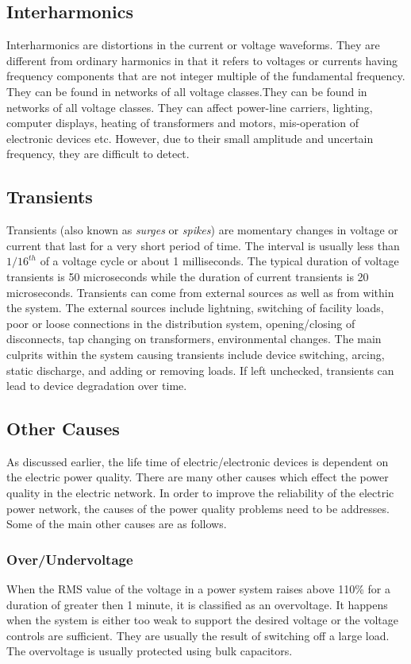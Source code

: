 \subsection{Interharmonics}
Interharmonics are distortions in the current or voltage waveforms. They are different from ordinary harmonics in that it refers to voltages or currents having frequency components that are not integer multiple of the fundamental frequency. They can be found in networks of all voltage classes.They can be found in networks of all voltage classes. They can affect power-line carriers, lighting, computer displays, heating of transformers and motors, mis-operation of electronic devices etc. However, due to their small amplitude and uncertain frequency, they are difficult to detect.

\subsection{Transients}
Transients (also known as \textit{surges} or \textit{spikes}) are momentary changes in voltage or current that last for a very short period of time. The interval is usually less than $1/16^{th}$ of a voltage cycle or about 1 milliseconds. The typical duration of voltage transients is 50 microseconds while the duration of current transients is 20 microseconds. Transients can come from external sources as well as from within the system. The external sources include lightning, switching of facility loads, poor or loose connections in the distribution system, opening/closing of disconnects, tap changing on transformers, environmental changes. The main culprits within the system causing transients include device switching, arcing, static discharge, and adding or removing loads. If left unchecked, transients can lead to device degradation over time.

\subsection{Other Causes}
As discussed earlier, the life time of electric/electronic devices is dependent on the electric power quality. There are many other causes which effect the power quality in the electric network. In order to improve the reliability of the electric power network, the causes of the power quality problems need to be addresses. Some of the main other causes are as follows.

\subsubsection{Over/Undervoltage}
When the RMS value of the voltage in a power system raises above 110\% for a duration of greater then 1 minute, it is classified as an overvoltage. It happens when the system is either too weak to support the desired voltage or the voltage controls are sufficient. They are usually the result of switching off a large load. The overvoltage is usually protected using bulk capacitors.

